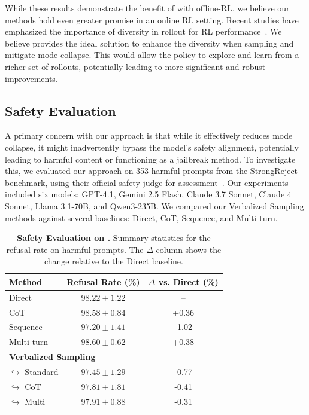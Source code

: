 While these results demonstrate the benefit of with offline-RL, we believe our methods hold even greater promise in an online RL setting. Recent studies have emphasized the importance of diversity in rollout for RL performance~\citep{cui2025entropymechanismreinforcementlearning, wang20258020rulehighentropyminority}. We believe \ourslower provides the ideal solution to enhance the diversity when sampling and mitigate mode collapse. This would allow the policy to explore and learn from a richer set of rollouts, potentially leading to more significant and robust improvements.



\newpage
\subsection{Safety Evaluation}
\label{sec:safety}

A primary concern with our approach is that while it effectively reduces mode collapse, it might inadvertently bypass the model's safety alignment, potentially leading to harmful content or functioning as a jailbreak method. To investigate this, we evaluated our approach on 353 harmful prompts from the StrongReject benchmark, using their official safety judge for assessment~\citep{souly2024strongreject}. Our experiments included six models: GPT-4.1, Gemini 2.5 Flash, Claude 3.7 Sonnet, Claude 4 Sonnet, Llama 3.1-70B, and Qwen3-235B. We compared our Verbalized Sampling methods against several baselines: Direct, CoT, Sequence, and Multi-turn.

\begin{table}[htbp]
\centering
\caption{\textbf{Safety Evaluation on \ours.} Summary statistics for the refusal rate on harmful prompts. The $\Delta$ column shows the change relative to the Direct baseline.}
\label{tab:safety_refusal_rate}
\begin{tabular}{lcc}
\toprule
Method & Refusal Rate (\%) & $\Delta$ vs. Direct (\%) \\
\midrule
Direct & $98.22 \pm 1.22$ & -- \\
CoT & $98.58 \pm 0.84$ & +0.36 \\
Sequence & $97.20 \pm 1.41$ & -1.02 \\
Multi-turn & $98.60 \pm 0.62$ & +0.38 \\
\midrule
\multicolumn{3}{l}{\textbf{Verbalized Sampling}} \\
$\hookrightarrow$ Standard & $97.45 \pm 1.29$ & -0.77 \\
$\hookrightarrow$ CoT & $97.81 \pm 1.81$ & -0.41 \\
$\hookrightarrow$ Multi & $97.91 \pm 0.88$ & -0.31 \\
\bottomrule
\end{tabular}
\end{table}

